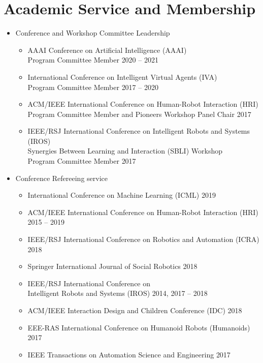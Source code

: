 \documentclass[10pt,letterpaper]{article}
\newcommand{\thing}[2]{{#1} \hfill {#2}}
\begin{document}
\section{Academic Service and Membership}
\begin{itemize}%
\item Conference and Workshop Committee Leadership
	\begin{itemize}\setlength\itemsep{0em}
	\item \thing{AAAI Conference on Artificial Intelligence (AAAI) \\Program Committee Member}{2020 -- 2021}
	\item \thing{International Conference on Intelligent Virtual Agents (IVA) \\Program Committee Member}{2017 -- 2020}
	\item \thing{ACM/IEEE International Conference on Human-Robot Interaction (HRI) \\Program Committee Member and Pioneers Workshop Panel Chair}{2017}
	\item \thing{IEEE/RSJ International Conference on Intelligent Robots and Systems (IROS) \\Synergies Between Learning and Interaction (SBLI) Workshop\\Program Committee Member}{2017}
	\end{itemize}
\item Conference Refereeing service
	\begin{itemize}\setlength\itemsep{0em}
	\item \thing{International Conference on Machine Learning (ICML)}{2019}
	\item \thing{ACM/IEEE International Conference on Human-Robot Interaction (HRI)}{2015 -- 2019}
	\item \thing{IEEE/RSJ International Conference on Robotics and Automation (ICRA)}{2018}
	\item \thing{Springer International Journal of Social Robotics}{2018}
	\item \thing{IEEE/RSJ International Conference on \\ Intelligent Robots and Systems (IROS)}{2014, 2017 -- 2018}
	\item \thing{ACM/IEEE Interaction Design and Children Conference (IDC)}{2018}
	\item \thing{EEE-RAS International Conference on Humanoid Robots (Humanoids)}{2017}
	\item \thing{IEEE Transactions on Automation Science and Engineering}{2017}

\end{itemize}
\end{itemize}
\end{document}
